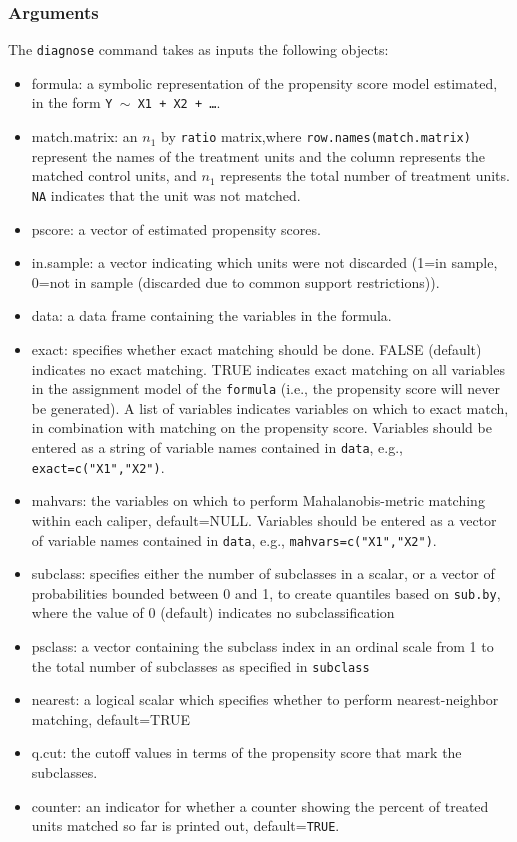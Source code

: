 \documentclass[oneside,letterpaper,titlepage]{article}
\begin{document}
\begin{appendix}
\subsubsection{Arguments}
The \texttt{diagnose} command takes as inputs the following objects:
\begin{itemize}
\item{formula}: a symbolic representation of the propensity score
  model estimated, in the form {\tt Y $\sim$ X1 + X2 + \dots}.
\item{match.matrix}: an $n_1$ by \texttt{ratio} matrix,where
  \texttt{row.names(match.matrix)} represent the names of the
  treatment units and the column represents the matched control units,
  and $n_1$ represents the total number of treatment units.
  \texttt{NA} indicates that the unit was not matched.
\item{pscore}: a vector of estimated propensity scores.  
\item{in.sample}: a vector indicating which units were not discarded
  (1=in sample, 0=not in sample (discarded due to common support
  restrictions)).
\item{data}: a data frame containing the variables in the formula.
\item{exact}: specifies whether exact matching should be done.  FALSE
  (default) indicates no exact matching.  TRUE indicates exact
  matching on all variables in the assignment model of the
  \texttt{formula} (i.e., the propensity score will never be
  generated).  A list of variables indicates variables on which to
  exact match, in combination with matching on the propensity score.
  Variables should be entered as a string of variable names contained
  in \texttt{data}, e.g., \texttt{exact=c("X1","X2")}.
\item{mahvars}: the variables on which to perform Mahalanobis-metric
  matching within each caliper, default=NULL.  Variables should be
  entered as a vector of variable names contained in \texttt{data},
  e.g., \texttt{mahvars=c("X1","X2")}.
\item{subclass}: specifies either the number of
  subclasses in a scalar, or a vector of probabilities bounded
  between 0 and 1, to create quantiles based on \texttt{sub.by}, where the value of
  0 (default) indicates no subclassification
\item{psclass}: a vector containing the subclass index in an ordinal
  scale from 1 to the total number of subclasses as specified in
  \texttt{subclass}
\item{nearest}: a logical scalar which specifies whether to perform
  nearest-neighbor matching, default=TRUE
\item{q.cut}: the cutoff values in terms of the propensity score that
  mark the subclasses.
\item{counter}: an indicator for whether a counter showing the percent
  of treated units matched so far is printed out, default={\tt TRUE}.
\end{itemize}


\end{appendix}
\end{document}
